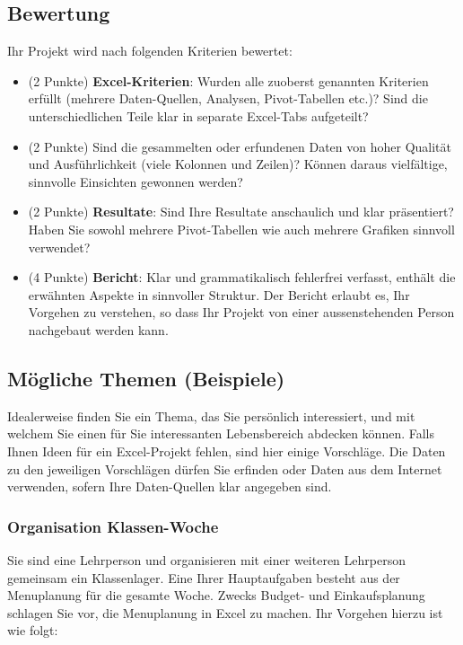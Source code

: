 \subsection*{Bewertung}

Ihr Projekt wird nach folgenden Kriterien bewertet:
\begin{itemize}
	\item (2 Punkte) \textbf{Excel-Kriterien}: Wurden alle zuoberst genannten Kriterien erfüllt (mehrere Daten-Quellen, Analysen, Pivot-Tabellen etc.)? Sind die unterschiedlichen Teile klar in separate Excel-Tabs aufgeteilt?
	\item (2 Punkte) Sind die gesammelten oder erfundenen Daten von hoher Qualität und Ausführlichkeit (viele Kolonnen und Zeilen)? Können daraus vielfältige, sinnvolle Einsichten gewonnen werden?
	\item (2 Punkte) \textbf{Resultate}: Sind Ihre Resultate anschaulich und klar präsentiert? Haben Sie sowohl mehrere Pivot-Tabellen wie auch mehrere Grafiken sinnvoll verwendet?
	\item (4 Punkte) \textbf{Bericht}: Klar und grammatikalisch fehlerfrei verfasst, enthält die erwähnten Aspekte in sinnvoller Struktur. Der Bericht erlaubt es, Ihr Vorgehen zu verstehen, so dass Ihr Projekt von einer aussenstehenden Person nachgebaut werden kann.
\end{itemize}

\newpage
\subsection*{Mögliche Themen (Beispiele)}

Idealerweise finden Sie ein Thema, das Sie persönlich interessiert, und mit welchem Sie einen für Sie interessanten Lebensbereich abdecken können. Falls Ihnen Ideen für ein Excel-Projekt fehlen, sind hier einige Vorschläge. Die Daten zu den jeweiligen Vorschlägen dürfen Sie erfinden oder Daten aus dem Internet verwenden, sofern Ihre Daten-Quellen klar angegeben sind.

\subsubsection*{Organisation Klassen-Woche}
Sie sind eine Lehrperson und organisieren mit einer weiteren Lehrperson gemeinsam ein Klassenlager. Eine Ihrer Hauptaufgaben besteht aus der Menuplanung für die gesamte Woche. Zwecks Budget- und Einkaufsplanung schlagen Sie vor, die Menuplanung in Excel zu machen. Ihr Vorgehen hierzu ist wie folgt:

